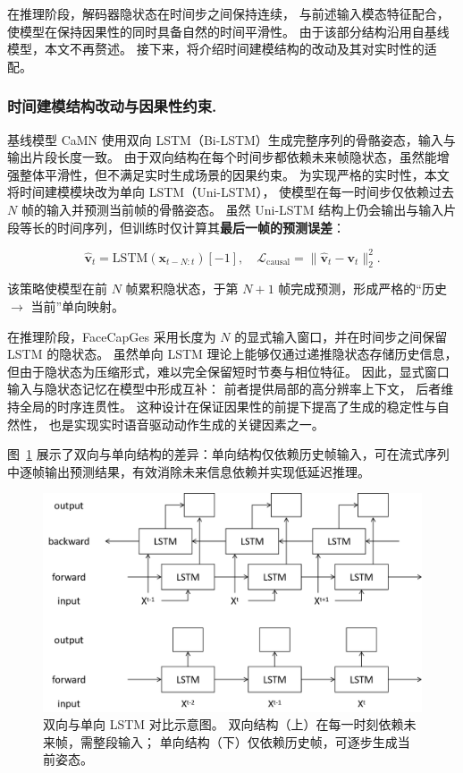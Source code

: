 在推理阶段，解码器隐状态在时间步之间保持连续，
与前述输入模态特征配合，使模型在保持因果性的同时具备自然的时间平滑性。
由于该部分结构沿用自基线模型，本文不再赘述。
接下来，将介绍时间建模结构的改动及其对实时性的适配。

\subsubsection{时间建模结构改动与因果性约束.}

基线模型 CaMN 使用双向 LSTM（Bi-LSTM）生成完整序列的骨骼姿态，输入与输出片段长度一致。
由于双向结构在每个时间步都依赖未来帧隐状态，虽然能增强整体平滑性，但不满足实时生成场景的因果约束。
为实现严格的实时性，本文将时间建模模块改为单向 LSTM（Uni-LSTM），
使模型在每一时间步仅依赖过去 $N$ 帧的输入并预测当前帧的骨骼姿态。
虽然 Uni-LSTM 结构上仍会输出与输入片段等长的时间序列，但训练时仅计算其\textbf{最后一帧的预测误差}：

\begin{equation}
\hat{\bm{v}}_{t} = \mathrm{LSTM}(\bm{x}_{t-N:t})[-1],
\quad
\mathcal{L}_{\text{causal}} = \|\hat{\bm{v}}_t - \bm{v}_t\|_2^2.
\end{equation}

该策略使模型在前 $N$ 帧累积隐状态，于第 $N+1$ 帧完成预测，形成严格的“历史 $\rightarrow$ 当前”单向映射。

在推理阶段，FaceCapGes 采用长度为 $N$ 的显式输入窗口，并在时间步之间保留 LSTM 的隐状态。
虽然单向 LSTM 理论上能够仅通过递推隐状态存储历史信息，
但由于隐状态为压缩形式，难以完全保留短时节奏与相位特征。
因此，显式窗口输入与隐状态记忆在模型中形成互补：
前者提供局部的高分辨率上下文，
后者维持全局的时序连贯性。
这种设计在保证因果性的前提下提高了生成的稳定性与自然性，
也是实现实时语音驱动动作生成的关键因素之一。

图~\ref{fig_lstmcompare} 展示了双向与单向结构的差异：单向结构仅依赖历史帧输入，可在流式序列中逐帧输出预测结果，有效消除未来信息依赖并实现低延迟推理。

\begin{figure}[h!t]
\centering
\includegraphics[width=0.9\linewidth]{figures/Fig_lstmcompare.png}
\caption{双向与单向 LSTM 对比示意图。
双向结构（上）在每一时刻依赖未来帧，需整段输入；
单向结构（下）仅依赖历史帧，可逐步生成当前姿态。}
\label{fig_lstmcompare}
\end{figure}

